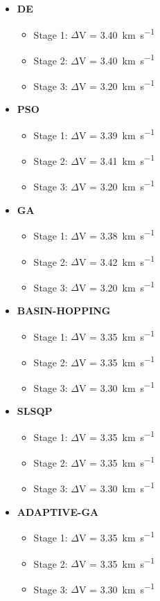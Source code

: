 \documentclass[11pt]{article}
\begin{document}
\begin{itemize}
\item \textbf{DE}
\begin{itemize}
    \item Stage 1: $\Delta$V = \SI{3.40}{\kilo\meter\per\second}
    \item Stage 2: $\Delta$V = \SI{3.40}{\kilo\meter\per\second}
    \item Stage 3: $\Delta$V = \SI{3.20}{\kilo\meter\per\second}
\end{itemize}

\item \textbf{PSO}
\begin{itemize}
    \item Stage 1: $\Delta$V = \SI{3.39}{\kilo\meter\per\second}
    \item Stage 2: $\Delta$V = \SI{3.41}{\kilo\meter\per\second}
    \item Stage 3: $\Delta$V = \SI{3.20}{\kilo\meter\per\second}
\end{itemize}

\item \textbf{GA}
\begin{itemize}
    \item Stage 1: $\Delta$V = \SI{3.38}{\kilo\meter\per\second}
    \item Stage 2: $\Delta$V = \SI{3.42}{\kilo\meter\per\second}
    \item Stage 3: $\Delta$V = \SI{3.20}{\kilo\meter\per\second}
\end{itemize}

\item \textbf{BASIN-HOPPING}
\begin{itemize}
    \item Stage 1: $\Delta$V = \SI{3.35}{\kilo\meter\per\second}
    \item Stage 2: $\Delta$V = \SI{3.35}{\kilo\meter\per\second}
    \item Stage 3: $\Delta$V = \SI{3.30}{\kilo\meter\per\second}
\end{itemize}

\item \textbf{SLSQP}
\begin{itemize}
    \item Stage 1: $\Delta$V = \SI{3.35}{\kilo\meter\per\second}
    \item Stage 2: $\Delta$V = \SI{3.35}{\kilo\meter\per\second}
    \item Stage 3: $\Delta$V = \SI{3.30}{\kilo\meter\per\second}
\end{itemize}

\item \textbf{ADAPTIVE-GA}
\begin{itemize}
    \item Stage 1: $\Delta$V = \SI{3.35}{\kilo\meter\per\second}
    \item Stage 2: $\Delta$V = \SI{3.35}{\kilo\meter\per\second}
    \item Stage 3: $\Delta$V = \SI{3.30}{\kilo\meter\per\second}
\end{itemize}
\end{itemize}
\end{document}
